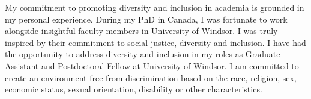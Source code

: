 My commitment to promoting diversity and inclusion in academia is grounded in my personal experience. During my PhD in Canada, I was fortunate to work alongside insightful faculty members in University of Windsor. I was truly inspired by their commitment to social justice, diversity and inclusion. 
  I have had the opportunity to address diversity and inclusion  in my roles as Graduate Assistant and Postdoctoral Fellow at University of Windsor. 
 I am committed to create an environment free from discrimination based on the race, religion, sex, economic status, sexual orientation, disability or other characteristics.
